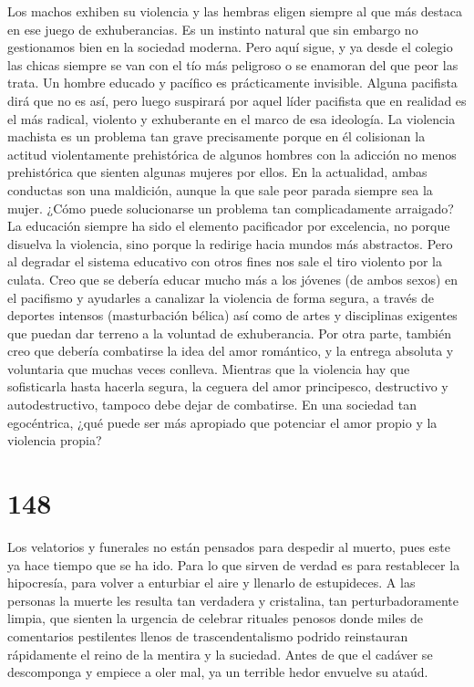 \documentclass[a4paper,11pt,openright,twocolumn]{book}
\begin{document}
Los machos exhiben su violencia y las hembras eligen siempre al que más destaca en ese juego de
exhuberancias. Es un instinto natural que sin embargo no gestionamos bien en la sociedad moderna. Pero aquí sigue,
y ya desde el colegio las chicas siempre se van con el tío más peligroso o se enamoran del que peor las trata.
Un hombre educado y pacífico es prácticamente invisible. Alguna pacifista dirá que no es así, pero luego
suspirará por aquel líder pacifista que en realidad es el más radical, violento y exhuberante en el marco de
esa ideología. La violencia machista es un problema tan grave precisamente porque en él colisionan la actitud violentamente
prehistórica de algunos hombres con la adicción no menos prehistórica que sienten algunas mujeres por ellos. En
la actualidad, ambas conductas son una maldición, aunque la que sale peor parada siempre sea la mujer. ¿Cómo
puede solucionarse un problema tan complicadamente arraigado? La educación siempre ha sido el elemento
pacificador por excelencia, no porque disuelva la violencia, sino porque la redirige hacia mundos más abstractos.
Pero al degradar el sistema educativo con otros fines nos sale el tiro violento por la culata. Creo que se debería 
educar mucho más a los jóvenes (de ambos sexos) en el pacifismo y ayudarles a canalizar la violencia de forma segura, a través
de deportes intensos (masturbación bélica) así como de artes y disciplinas exigentes que puedan dar terreno a la voluntad de exhuberancia. Por otra parte,
 también creo que debería combatirse la idea
del amor romántico, y la entrega absoluta y voluntaria que muchas veces conlleva. Mientras que la violencia
hay que sofisticarla hasta hacerla segura, la ceguera del amor principesco, destructivo y autodestructivo,
 tampoco debe dejar de combatirse. En una sociedad tan egocéntrica, ¿qué puede ser más apropiado que potenciar el 
amor propio y la violencia propia? 

\section*{148}

Los velatorios y funerales no están pensados para despedir al muerto, pues este ya hace tiempo que se ha
ido. Para lo que sirven de verdad es para restablecer la hipocresía, para volver a enturbiar el aire
y llenarlo de estupideces. A las personas la muerte les resulta tan verdadera y cristalina, tan
perturbadoramente limpia, que sienten la urgencia de celebrar rituales penosos donde miles de comentarios
pestilentes llenos de trascendentalismo podrido reinstauran rápidamente el reino de la mentira y la suciedad.
Antes de que el cadáver se descomponga y empiece a oler mal,
ya un terrible hedor envuelve su ataúd. 
\end{document}

